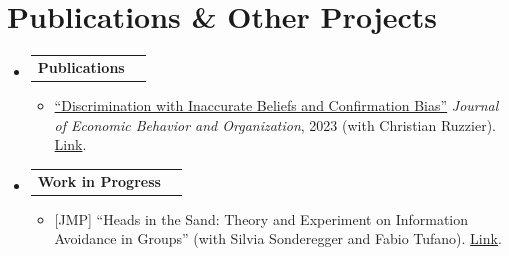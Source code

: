 \documentclass[letterpaper,11pt]{article}
\makeatletter
\newcommand{\link}[2]{{\color{NavyBlue}\href{#1}{#2}}}
\newcommand{\resumeItem}[1]{
  \item\small{
    {#1 \vspace{-2pt}}
  }
}
\newcommand{\resumeProjectHeading}[2]{
    \item
    \begin{tabular*}{0.97\textwidth}{l@{\extracolsep{\fill}}r}
      \small#1 & #2 \\
    \end{tabular*}\vspace{-7pt}
}
\newcommand{\resumeSubHeadingListStart}{\begin{itemize}[leftmargin=0.15in, label={}]}
\newcommand{\resumeSubHeadingListEnd}{\end{itemize}}
\newcommand{\resumeItemListStart}{\begin{itemize}}
\newcommand{\resumeItemListEnd}{\end{itemize}\vspace{-5pt}}
\makeatother
\begin{document}
\section{Publications \& Other Projects}
    \resumeSubHeadingListStart
      \resumeProjectHeading
          {\textbf{Publications}}{}
          \resumeItemListStart
            \resumeItem{\href{https://doi.org/10.1016/j.jebo.2023.04.018}{``Discrimination with Inaccurate Beliefs and Confirmation Bias''} \textit{Journal of Economic Behavior and Organization}, 2023 (with Christian Ruzzier). \link{https://doi.org/10.1016/j.jebo.2023.04.018}{Link}.}
          \resumeItemListEnd
      \resumeProjectHeading
          {\textbf{Work in Progress}}{}
          \resumeItemListStart
            \resumeItem{[JMP] ``Heads in the Sand: Theory and Experiment on Information Avoidance in Groups'' (with Silvia Sonderegger and Fabio Tufano). \link{https://drive.google.com/file/d/1kDA0-QnrY-KgdvMEDO_jXqlxytBnZo_J/view?usp=sharing}{Link}.}
          \resumeItemListEnd
        
    \resumeSubHeadingListEnd

\end{document}
